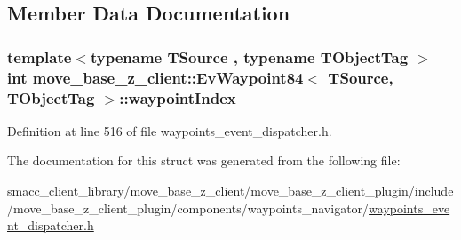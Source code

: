 \subsection{Member Data Documentation}
\subsubsection[{\texorpdfstring{waypoint\+Index}{waypointIndex}}]{\setlength{\rightskip}{0pt plus 5cm}template$<$typename T\+Source , typename T\+Object\+Tag $>$ int {\bf move\+\_\+base\+\_\+z\+\_\+client\+::\+Ev\+Waypoint84}$<$ T\+Source, T\+Object\+Tag $>$\+::waypoint\+Index}\hypertarget{structmove__base__z__client_1_1EvWaypoint84_a530e799efb6e13dccf89eca731db0667}{}\label{structmove__base__z__client_1_1EvWaypoint84_a530e799efb6e13dccf89eca731db0667}


Definition at line 516 of file waypoints\+\_\+event\+\_\+dispatcher.\+h.



The documentation for this struct was generated from the following file\+:\begin{DoxyCompactItemize}
\item 
smacc\+\_\+client\+\_\+library/move\+\_\+base\+\_\+z\+\_\+client/move\+\_\+base\+\_\+z\+\_\+client\+\_\+plugin/include/move\+\_\+base\+\_\+z\+\_\+client\+\_\+plugin/components/waypoints\+\_\+navigator/\hyperlink{waypoints__event__dispatcher_8h}{waypoints\+\_\+event\+\_\+dispatcher.\+h}\end{DoxyCompactItemize}
